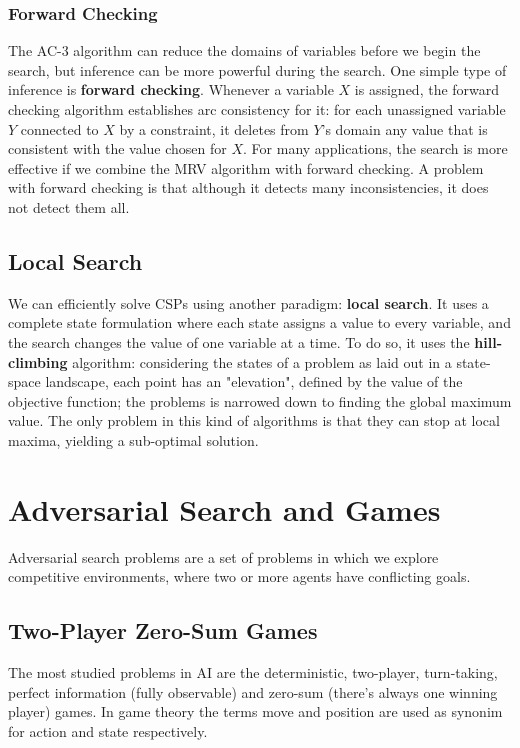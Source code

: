 \documentclass{article}
\begin{document}
\subsubsection{Forward Checking}
The AC-3 algorithm can reduce the domains of variables before we begin the search, but inference can be more powerful during the search. One simple type of inference is \textbf{forward checking}. Whenever a variable $X$ is assigned, the forward checking algorithm establishes arc consistency for it: for each unassigned variable $Y$ connected to $X$ by a constraint, it deletes from $Y$'s domain any value that is consistent with the value chosen for $X$. For many applications, the search is more effective if we combine the MRV algorithm with forward checking. A problem with forward checking is that although it detects many inconsistencies, it does not detect them all.

\subsection{Local Search}
We can efficiently solve CSPs using another paradigm: \textbf{local search}. It uses a complete state formulation where each state assigns a value to every variable, and the search changes the value of one variable at a time. To do so, it uses the \textbf{hill-climbing} algorithm: considering the states of a problem as laid out in a state-space landscape, each point has an "elevation", defined by the value of the objective function; the problems is narrowed down to finding the global maximum value. The only problem in this kind of algorithms is that they can stop at local maxima, yielding a sub-optimal solution.

\newpage
\section{Adversarial Search and Games}
Adversarial search problems are a set of problems in which we explore competitive environments, where two or more agents have conflicting goals.

\subsection{Two-Player Zero-Sum Games}
The most studied problems in AI are the deterministic, two-player, turn-taking, perfect information (fully observable) and zero-sum (there's always one winning player) games. In game theory the terms move and position are used as synonim for action and state respectively.
\end{document}
